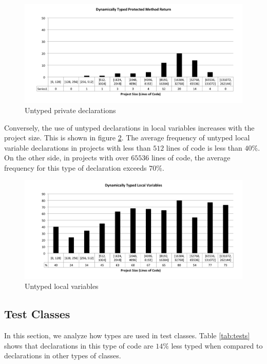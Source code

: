 \documentclass[preprint]{sigplanconf}
\begin{document}
\begin{figure}[ht]
\centering 
\includegraphics[width=1\textwidth]{images/size_proMethodReturn} 
\caption{Untyped private declarations}
\label{fig:size_proMethodReturn} 
\end{figure}

Conversely, the use of untyped declarations in local variables increases with the project size. 
This is shown in figure \ref{fig:size_localVariable}. 
The average frequency of untyped local variable declarations in projects with less than $512$ lines of code is less than $40\%$. 
On the other side, in projects with over $65536$ lines of code, the average frequency for this type of declaration exceeds $70\%$.

\begin{figure}[ht]
\centering 
\includegraphics[width=1\textwidth]{images/size_localVariable} 
\caption{Untyped local variables}
\label{fig:size_localVariable} 
\end{figure}



\subsection{Test Classes\label{sub:scripts}}
In this section, we analyze how types are used in test classes.
Table \ref{tab:tests} shows that declarations in this type of code are $14\%$ less typed when compared to declarations in other types of classes.
\end{document}
